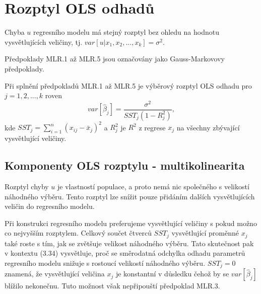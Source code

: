 \section{Rozptyl OLS odhadů}

\begin{assumption}
Chyba $u$ regresního modelu má stejný rozptyl bez ohledu na hodnotu 
vysvětlujících veličiny, tj. $var[u|x_1, x_2, 
..., x_k] = \sigma^2$.

\raggedleft{$\clubsuit$}
\end{assumption}

Předpoklady MLR.1 až MLR.5 jsou označovány jako Gauss-Markovovy předpoklady.

\begin{theorem} 
Při splnění předpokladů MLR.1 až MLR.5 je výběrový rozptyl OLS 
odhadu pro $j = 1, 2, ..., k$ roven
\begin{equation}
var[\hat{\beta}_j] = \frac{\sigma^2}{SST_j(1-R^2_j)},
\end{equation}
kde $SST_j = \sum_{i = 1}^n (x_{ij} - \bar{x}_j)^2$ a $R^2_j$ je $R^2$ z regrese $x_j$ na všechny zbývající 
vysvětlující veličiny.

\raggedleft{$\clubsuit$}
\end{theorem}

\subsection{Komponenty OLS rozptylu - multikolinearita}

Rozptyl chyby $u$ je vlastností populace, a proto nemá nic 
společného s velikostí náhodného výběru. Tento rozptyl lze 
snížit pouze přidáním dalších vysvětlujících veličin do 
regresního modelu.

Při konstrukci regresního modelu preferujeme vysvětlující veličiny s pokud možno co nejvyšším rozptylem. Celkový součet čtverců $SST_j$ 
vysvětlující proměnné $x_j$ také roste s tím, jak se zvětšuje velikost náhodného výběru. Tato skutečnost pak v kontextu (3.34) 
vysvětluje, proč se směrodatná odchylka odhadu parametrů regresního modelu snižuje s rostoucí velikostí náhodného výběru. $SST_j = 0$ 
znamená, že vysvětlující veličina $x_j$ je konstantní v důsledku čehož by se $var[\hat{\beta}_j]$ blížilo nekonečnu. Tuto možnost však 
nepřipouští předpoklad MLR.3.

